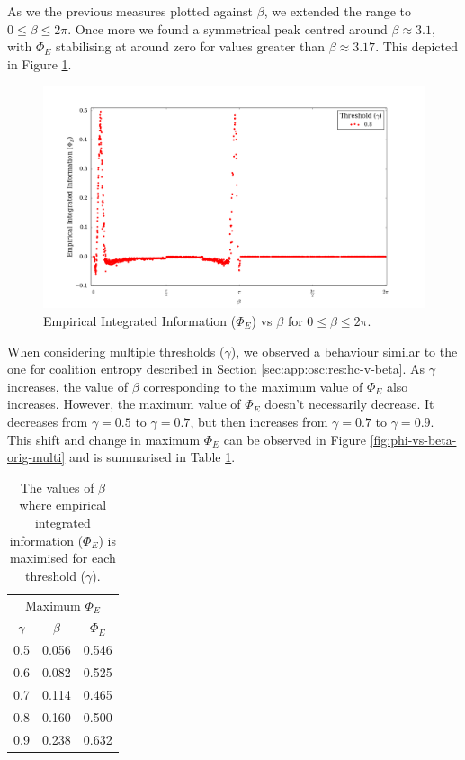 \documentclass[a4paper,11pt]{article}
\begin{document}
As we the previous measures plotted against $\beta$, we extended the range to $0 \leq \beta \leq 2\pi$. Once more we found a symmetrical peak centred around $\beta \approx 3.1$, with $\Phi_E$ stabilising at around zero for values greater than $\beta \approx 3.17$. This depicted in Figure \ref{fig:phi-vs-beta-ext}.

\begin{figure}[H]
\begin{center}
\includegraphics[scale = 0.35]{figures/phi_vs_beta_ext}
\caption{
	Empirical Integrated Information ($\Phi_E$) vs $\beta$ for $0 \leq \beta \leq 2\pi$.
	\label{fig:phi-vs-beta-ext}
}
\end{center}
\end{figure}


When considering multiple thresholds ($\gamma$), we observed a behaviour similar to the one for coalition entropy described in Section \ref{sec:app:osc:res:hc-v-beta}. As $\gamma$ increases, the value of $\beta$ corresponding to the maximum value of $\Phi_E$ also increases. However, the maximum value of $\Phi_E$ doesn't necessarily decrease. It decreases from $\gamma = 0.5$ to $\gamma = 0.7$, but then increases from $\gamma = 0.7$ to $\gamma = 0.9$. This shift and change in maximum $\Phi_E$ can be observed in Figure \ref{fig:phi-vs-beta-orig-multi} and is summarised in Table \ref{tab:max-phi-beta}.

\begin{table}[H]
\centering
\begin{tabular}{ c | c c }
\multicolumn{3}{c}{Maximum $\Phi_E$} \\ [2mm]
$\gamma$ & $\beta$ & $\Phi_E$\\
\hline
0.5 & 0.056 & 0.546 \\
0.6 & 0.082 & 0.525 \\
0.7 & 0.114 & 0.465 \\
0.8 & 0.160 & 0.500 \\
0.9 & 0.238 & 0.632 \\
\end{tabular}
\caption{
	The values of $\beta$ where empirical integrated information ($\Phi_E$) is maximised for each threshold ($\gamma$).
	\label{tab:max-phi-beta}
}
\end{table}
\end{document}

